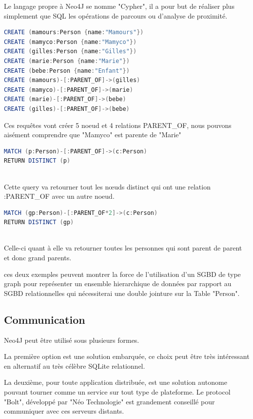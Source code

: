\documentclass[a4paper,fleqn,12pt]{report}
\begin{document}
Le langage propre à Neo4J se nomme "Cypher"\label{Cypher}, il a pour but de réaliser plus simplement que SQL les opérations de parcours ou d'analyse de proximité.

\begin{lstlisting}[language=java, frame=single]
CREATE (mamours:Person {name:"Mamours"})
CREATE (mamyco:Person {name:"Mamyco"})
CREATE (gilles:Person {name:"Gilles"})
CREATE (marie:Person {name:"Marie"})
CREATE (bebe:Person {name:"Enfant"})
CREATE (mamours)-[:PARENT_OF]->(gilles)
CREATE (mamyco)-[:PARENT_OF]->(marie)
CREATE (marie)-[:PARENT_OF]->(bebe)
CREATE (gilles)-[:PARENT_OF]->(bebe)
\end{lstlisting}

Ces requêtes vont créer 5 noeud et 4 relations PARENT\_OF, nous pouvons aisément comprendre que "Mamyco" est parente de "Marie"

\begin{lstlisting}[language=java, frame=single]
MATCH (p:Person)-[:PARENT_OF]->(c:Person) 
RETURN DISTINCT (p)
	
\end{lstlisting}

Cette query va retourner tout les nœuds distinct qui ont une relation :PARENT\_OF avec un autre noeud.

\begin{lstlisting}[language=java, frame=single]
MATCH (gp:Person)-[:PARENT_OF*2]->(c:Person) 
RETURN DISTINCT (gp)
	
\end{lstlisting}

Celle-ci quant à elle va retourner toutes les personnes qui sont parent de parent et donc grand parents. 

ces deux exemples peuvent montrer la force de l'utilisation d'un SGBD de type graph pour représenter un ensemble hierarchique de données par rapport au SGBD relationnelles qui nécessiterai une double jointure sur la Table "Person".

\subsection{Communication}

Neo4J peut être utilisé sous plusieurs formes. 

La première option est une solution embarquée, ce choix peut être très intéressant en alternatif au très célèbre SQLite relationnel.

La deuxième, pour toute application distribuée, est une solution autonome pouvant tourner comme un service sur tout type de plateforme. Le protocol "Bolt", développé par "Néo Technologie" est grandement conseillé pour communiquer avec ces serveurs distants. 
\end{document}
